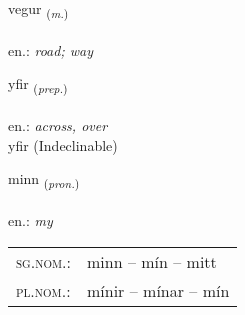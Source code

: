 \documentclass[frontgrid, backgrid]{flacards}\usepackage[]{graphicx}\usepackage[]{xcolor}
\begin{document}
{vegur \small{\textsubscript{(\textit{m.})}} \\[1ex] %
\textphonetic{[vɛːɣʏr]} \\
en.: \emph{road; way} \\  [2ex]
\renewcommand*{\arraystretch}{0.8}
}


\renewcommand{\flhead}{\vskip5pt \fboxsep=0pt {\small\bfseries\footnotesize Forsetning | Preposition}}
\renewcommand{\fcfoot}{\vskip5pt \fboxsep=0pt \hspace{2pt}{\small\bfseries\footnotesize 1K}}

\renewcommand{\blhead}{\vskip5pt {\small\bfseries\footnotesize Forsetning | Preposition }}
\renewcommand{\bcfoot}{\vskip5pt \hspace{2pt}{\small\bfseries\footnotesize 1K}}


{yfir \small{\textsubscript{(\textit{prep.})}} \\[1ex]
\textphonetic{[ɪːvɪr]} \\
en.: \emph{across, over} \\  [2ex]
yfir (Indeclinable)}

\renewcommand{\flhead}{\vskip5pt \fboxsep=0pt {\small\bfseries\footnotesize Fornafn | Pronoun}}
\renewcommand{\fcfoot}{\vskip5pt \fboxsep=0pt \hspace{2pt}{\small\bfseries\footnotesize 1K}}

\renewcommand{\blhead}{\vskip5pt {\small\bfseries\footnotesize Fornafn | Pronoun }}
\renewcommand{\bcfoot}{\vskip5pt \hspace{2pt}{\small\bfseries\footnotesize 1K}}


{minn \small{\textsubscript{(\textit{pron.})}} \\[1ex] %
\textphonetic{[mɪn]} \\
en.: \emph{my} \\  [2ex]
\renewcommand*{\arraystretch}{0.8}
\begin{tabular}{ll}
\textsc{sg.nom.}: & minn  --  mín -- mitt \\ 
\textsc{pl.nom.}: & mínir -- mínar -- mín
\end{tabular}
}
\end{document}
